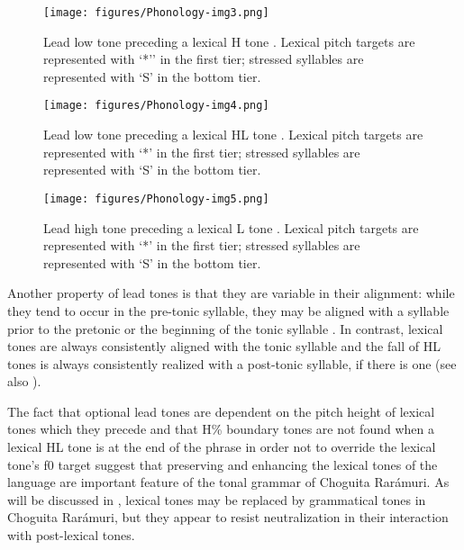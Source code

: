 \begin{figure}
\texttt{[image: figures/Phonology-img3.png]}
\caption{
\label{fig: Lead L tone preceding a lexical H tone}
Lead low tone preceding a lexical H tone \parencite{garellek2015lexical}. Lexical pitch targets are represented with `*'' in the first tier; stressed syllables are represented with `S' in the bottom tier.}
\end{figure}

\begin{figure}
\texttt{[image: figures/Phonology-img4.png]}
\caption{
\label{fig: Lead L tone preceding a lexical HL tone}
Lead low tone preceding a lexical HL tone \parencite{garellek2015lexical}. Lexical pitch targets are represented with `*' in the first tier; stressed syllables are represented with `S' in the bottom tier.}
\end{figure}

\begin{figure}
\texttt{[image: figures/Phonology-img5.png]}
\caption{
\label{fig: Lead H tone preceding a lexical L tone}
Lead high tone preceding a lexical L tone \parencite{garellek2015lexical}. Lexical pitch targets are represented with `*' in the first tier; stressed syllables are represented with `S' in the bottom tier.}
\end{figure}

Another property of lead tones is that they are variable in their alignment: while they tend to occur in the pre-tonic syllable, they may be aligned with a syllable prior to the pretonic or the beginning of the tonic syllable \parencite{garellek2015lexical}. In contrast, lexical tones are always consistently aligned with the tonic syllable and the fall of HL tones is always consistently realized with a post-tonic syllable, if there is one (see also \citealt{caballero2015tone}).

The fact that optional lead tones are dependent on the pitch height of lexical tones which they precede and that H\% boundary tones are not found when a lexical HL tone is at the end of the phrase in order not to override the lexical tone's f0 target suggest that preserving and enhancing the lexical tones of the language are important feature of the tonal grammar of Choguita Rarámuri. As will be discussed in , lexical tones may be replaced by grammatical tones in Choguita Rarámuri, but they appear to resist neutralization in their interaction with post-lexical tones.


